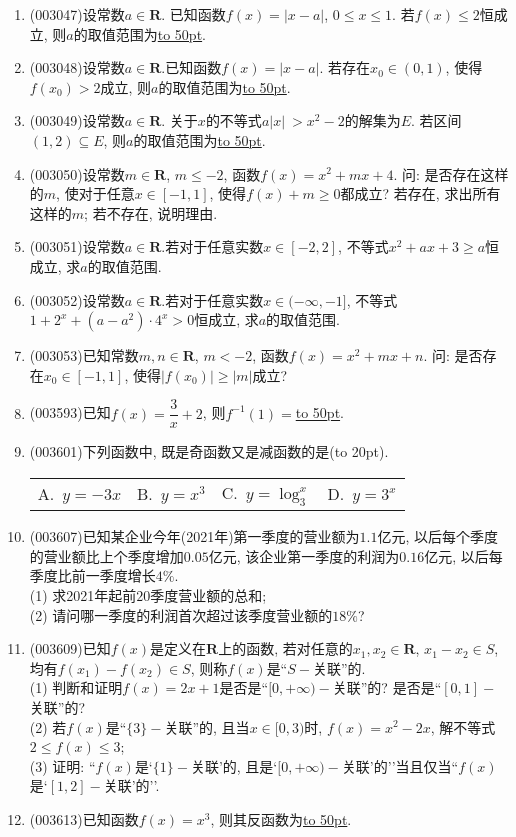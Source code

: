 \documentclass[10pt,a4paper]{article}
\newcommand{\blank}[1]{\underline{\hbox to #1pt{}}}
\newcommand{\bracket}[1]{(\hbox to #1pt{})}
\newcommand{\fourch}[4]{\par\begin{tabular}{p{.23\textwidth}p{.23\textwidth}p{.23\textwidth}p{.23\textwidth}}
A.~#1 &B.~#2& C.~#3& D.~#4
\end{tabular}}
\begin{document}
\begin{enumerate}[1.]
\item {\tiny (003047)}设常数$a\in \mathbf{R}$. 已知函数$f(x)=|x-a|$, $0\le x\le 1$. 若$f(x)\le 2$恒成立, 则$a$的取值范围为\blank{50}.
\item {\tiny (003048)}设常数$a\in \mathbf{R}$.已知函数$f(x)=|x-a|$. 若存在${x_0}\in (0,1)$, 使得$f({x_0})>2$成立, 则$a$的取值范围为\blank{50}.
\item {\tiny (003049)}设常数$a\in \mathbf{R}$. 关于$x$的不等式$a|x|\ >x^2-2$的解集为$E$. 若区间$(1,2)\subseteq E$, 则$a$的取值范围为\blank{50}.
\item {\tiny (003050)}设常数$m\in \mathbf{R}$, $m\le -2$, 函数$f(x)=x^2+mx+4$. 问: 是否存在这样的$m$, 使对于任意$x\in [-1,1]$, 使得$f(x)+m\ge 0$都成立? 若存在, 求出所有这样的$m$; 若不存在, 说明理由.
\item {\tiny (003051)}设常数$a\in \mathbf{R}$.若对于任意实数$x\in [-2,2]$, 不等式$x^2+ax+3\ge a$恒成立, 求$a$的取值范围.
\item {\tiny (003052)}设常数$a\in \mathbf{R}$.若对于任意实数$x\in (-\infty ,-1]$, 不等式$1+2^x+(a-a^2)\cdot 4^x>0$恒成立, 求$a$的取值范围.
\item {\tiny (003053)}已知常数$m, n\in \mathbf{R}$, $m<-2$, 函数$f(x)=x^2+mx+n$. 问: 是否存在$x_0\in [-1,1]$, 使得$|f(x_0)|\ge |m|$成立?
\item {\tiny (003593)}已知$f(x)=\dfrac3x+2$, 则$f^{-1}(1)=$\blank{50}.
\item {\tiny (003601)}下列函数中, 既是奇函数又是减函数的是\bracket{20}.
\fourch{$y=-3x$}{$y=x^3$}{$y=\log_3^x$}{$y=3^x$}
\item {\tiny (003607)}已知某企业今年(2021年)第一季度的营业额为$1.1$亿元, 以后每个季度的营业额比上个季度增加$0.05$亿元, 该企业第一季度的利润为$0.16$亿元, 以后每季度比前一季度增长$4\%$.\\ 
(1) 求2021年起前$20$季度营业额的总和;\\ 
(2) 请问哪一季度的利润首次超过该季度营业额的$18\%$?
\item {\tiny (003609)}已知$f(x)$是定义在$\mathbf{R}$上的函数, 若对任意的$x_1,x_2\in \mathbf{R}$, $x_1-x_2\in S$, 均有$f(x_1)-f(x_2)\in S$, 则称$f(x)$是``$S-$关联''的.\\
(1) 判断和证明$f(x)=2x+1$是否是``$[0,+\infty)-$关联''的? 是否是``$[0,1]-$关联''的?\\
(2) 若$f(x)$是``$\{3\}-$关联''的, 且当$x\in [0,3)$时, $f(x)=x^2-2x$, 解不等式$2 \le f(x)\le 3$;\\
(3) 证明: ``$f(x)$是`$\{1\}-$关联'的, 且是`$[0,+\infty)-$关联'的''当且仅当``$f(x)$是`$[1,2]-$关联'的''.
\item {\tiny (003613)}已知函数$f(x)=x^3$, 则其反函数为\blank{50}.

\end{enumerate}
\end{document}

